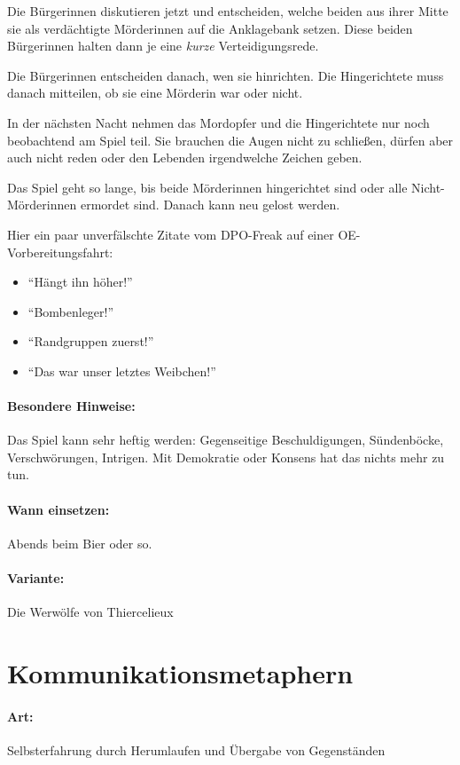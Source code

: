 Die Bürgerinnen diskutieren jetzt und entscheiden, welche beiden aus ihrer Mitte sie als verdächtigte Mörderinnen auf die Anklagebank setzen. Diese beiden Bürgerinnen halten dann je eine \emph{kurze} Verteidigungsrede.

Die Bürgerinnen entscheiden danach, wen sie hinrichten. Die Hingerichtete muss danach mitteilen, ob sie eine Mörderin war oder nicht.

In der nächsten Nacht nehmen das Mordopfer und die Hingerichtete nur noch beobachtend am Spiel teil. Sie brauchen die Augen nicht zu schließen, dürfen aber auch nicht reden oder den Lebenden irgendwelche Zeichen geben.

Das Spiel geht so lange, bis beide Mörderinnen hingerichtet sind oder alle Nicht-Mörderinnen ermordet sind. Danach kann neu gelost werden.

Hier ein paar unverfälschte Zitate vom DPO-Freak auf einer OE-Vorbereitungsfahrt:
\begin{itemize}
  \item "`Hängt ihn höher!"'
  \item "`Bombenleger!"'
  \item "`Randgruppen zuerst!"'
  \item "`Das war unser letztes Weibchen!"'
\end{itemize}

\paragraph{Besondere Hinweise:} Das Spiel kann sehr heftig werden: Gegenseitige Beschuldigungen, Sündenböcke, Verschwörungen, Intrigen. Mit Demokratie oder Konsens hat das nichts mehr zu tun.
\paragraph{Wann einsetzen:} Abends beim Bier oder so.
\paragraph{Variante:} Die Werwölfe von Thiercelieux

\section{Kommunikationsmetaphern}
\paragraph{Art:} Selbsterfahrung durch Herumlaufen und Übergabe von Gegenständen
